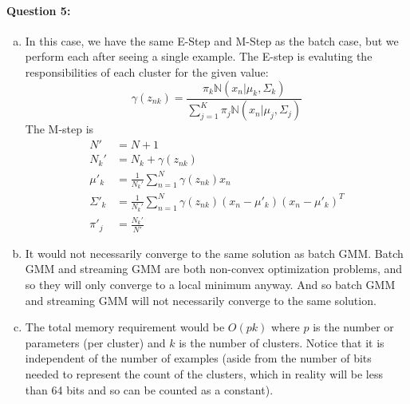 \documentclass[letterpaper,11pt]{article}
\begin{document}
\paragraph{Question 5:}
\begin{enumerate}[(a)]
    \item
        In this case, we have the same E-Step and M-Step as the batch case,
        but we perform each after seeing a single example. The E-step is
        evaluting the responsibilities of each cluster for the given
        value:
        \begin{equation}
        \gamma(z_{nk}) = \frac{\pi_k \mathbb{N}(x_n|\mu_k,\Sigma_k)}{\sum_{j=1}^K \pi_j\mathbb{N}(x_n|\mu_j,\Sigma_j)}
        \end{equation}
        The M-step is
        \begin{align}
            N' & = N + 1\\
         N_k ' & = N_k + \gamma(z_{nk})\\
        \mu'_k & = \frac{1}{N_k '} \sum_{n=1}^N \gamma(z_{nk}) x_n\\
     \Sigma'_k & = \frac{1}{N_k '} \sum_{n=1}^N \gamma(z_{nk}) (x_n - \mu'_k) (x_n - \mu'_k)^T\\
        \pi'_j & = \frac{N_k '}{N'}
        \end{align}
    \item
        It would not necessarily converge to the same solution as batch GMM\@.
        Batch GMM and streaming GMM are both non-convex optimization problems,
        and so they will only converge to a local minimum anyway. And so
        batch GMM and streaming GMM will not necessarily converge to the
        same solution.
    \item
        The total memory requirement would be $O(p k)$ where $p$ is the number
        or parameters (per cluster) and $k$ is the number of clusters. Notice
        that it is independent of the number of examples (aside from the number
        of bits needed to represent the count of the clusters, which in reality
        will be less than 64 bits and so can be counted as a constant).
\end{enumerate}
\end{document}
